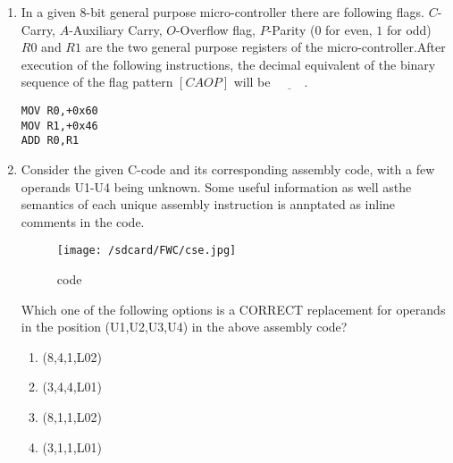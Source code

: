 \begin{enumerate}
\item In a given $8$-bit general purpose micro-controller there are following flags. $C$-Carry, $A$-Auxiliary Carry, $O$-Overflow flag, $P$-Parity ($0$ for even, $1$ for odd) $R0$ and $R1$ are the two general purpose registers of the micro-controller.After execution of the following instructions, the decimal equivalent of the binary sequence of the flag pattern $[CAOP]$ will be $\underline{\hspace{1cm}}$.\\


\begin{lstlisting}
MOV R0,+0x60
MOV R1,+0x46 
ADD R0,R1
\end{lstlisting}
    
\item
Consider the given C-code and its corresponding assembly code, with a few operands U1-U4 being unknown. Some useful information as well asthe semantics of each unique assembly instruction is annptated as inline comments in the code.

\begin{figure}
\centering                          
\texttt{[image: /sdcard/FWC/cse.jpg]}        
\caption{code}                     
\label{fig:code}
\end{figure}

Which one of the following options is a CORRECT replacement for operands in the position (U1,U2,U3,U4) in the above assembly code?                     
\begin{enumerate}[label=(\Alph*)]  
\item (8,4,1,L02)                  
\item (3,4,4,L01)
\item (8,1,1,L02)                  
\item (3,1,1,L01)                  
\end{enumerate}                    
\end{enumerate}                    
